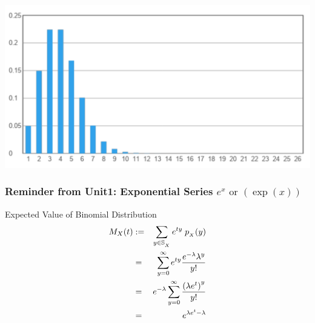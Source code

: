 \documentclass[compress]{beamer}
\begin{document}
\begin{frame}
\vspace{1in}
\includegraphics[scale=.3]{figs/PoissonExample1.png}
\end{frame}

{


\begin{frame}\frametitle{Reminder from Unit1: Exponential Series $e^x \text{ or }( \exp(x))$}
\vspace{-.1in}

\vspace{2.5in}


\end{frame}



}


\begin{frame}{Expected Value of Binomial Distribution}
\begin{eqnarray}
M_X(t)& := &  \sum_{y\in \support[X]} e^{ty}\; \pmf_{_X}(y) \nonumber\\
& = &  \sum_{y=0}^{\infty} e^{ty} \frac{e^{-\lambda} \lambda^y}{y!} \nonumber\\
& = &  e^{-\lambda}\sum_{y=0}^{\infty}  \frac{ \left( \lambda e^t\right)^y}{y!} \nonumber\\
& = &  e^{\lambda e^t-\lambda}
\end{eqnarray}



\end{frame}
\end{document}
